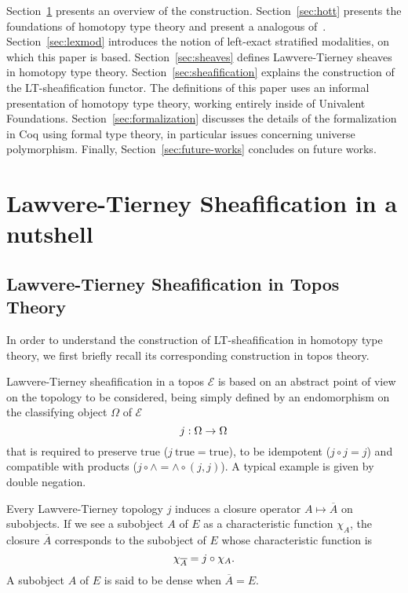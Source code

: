 \documentclass[preprint,9pt,numbers]{sigplanconf}
\newcommand \True {\mathrm{true}}
\newcommand \closure[1] {\overline{#1}}
\newcommand \Char[1] {\chi_{#1}}%
\newcommand \E {\mathcal{E}}
\newenvironment{mymath}[1][-0em]{%
  \newcommand\mymathaux{\vspace{#1}}%
  \vspace{#1}%
  \begin{equation*}%
  }{ %
    \mymathaux%
  \end{equation*}}
\begin{document}
Section~\ref{sec:lawv-tiern-nutshell} presents an overview of the construction. 
% 
Section~\ref{sec:hott} presents the foundations of homotopy type theory
and present a analogous of~\cite[Corollary 6.2.3.5]{lurie}. 
%
Section~\ref{sec:lexmod} introduces the notion of left-exact stratified
modalities, on which this paper is based.
%
Section~\ref{sec:sheaves} defines Lawvere-Tierney sheaves in homotopy
type theory.
%
Section~\ref{sec:sheafification} explains the construction of the
LT-sheafification functor.
%
The definitions of this paper uses an informal presentation of
homotopy type theory, working entirely inside of Univalent
Foundations. 
Section~\ref{sec:formalization} discusses the details of the
formalization in Coq using formal type theory, in particular issues
concerning universe polymorphism.
%
Finally, Section~\ref{sec:future-works} concludes on future works.

\section{Lawvere-Tierney Sheafification in a nutshell}
\label{sec:lawv-tiern-nutshell}

\subsection{Lawvere-Tierney Sheafification in Topos Theory}
\label{sec:lawv-tiern-sheaf}

In order to understand the construction of LT-sheafification in homotopy
type theory, we first briefly recall its corresponding construction in
topos theory. 

Lawvere-Tierney sheafification in a topos $\E$ is based on an abstract
point of view on the topology to be considered, being simply defined by an
endomorphism on the classifying object $\Omega$ of $\E$  
%
\begin{mymath}
j : \Omega \rightarrow \Omega
\end{mymath}%
%
that is required to preserve $\True$ ($j \ \True = \True$), to be
idempotent ($j \circ j = j$) and compatible with products ($j \circ
\wedge = \wedge \circ (j, j)$).
%
A typical example is given by double negation.

Every Lawvere-Tierney topology $j$ induces a closure operator
$A \mapsto \closure{A}$ on subobjects. If we see a subobject $A$ of $E$
as a characteristic function $\Char{A}$, the closure $\closure{A}$
corresponds to the subobject of $E$ whose characteristic function is 
%
\begin{mymath}
\Char{\closure{A}} = j \circ \Char{A}.
\end{mymath}%
%
A subobject $A$ of $E$ is said to
be dense when $\closure{A} = E$.
\end{document}
